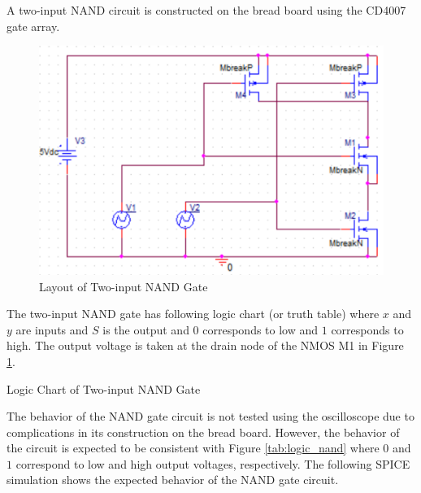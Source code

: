 
A two-input NAND circuit is constructed on the bread board using the CD4007 gate array.

\FloatBarrier

\begin{figure}[h!]
	\centering
	\includegraphics[scale=0.50]{./images/nand_schematic.PNG}
	\caption{Layout of Two-input NAND Gate}
	\label{fig:nand_schematic}
\end{figure}

\FloatBarrier

The two-input NAND gate has following logic chart (or truth table) where $x$ and $y$ are inputs and $S$ is the output and $0$ corresponds to low and $1$ corresponds to high.
The output voltage is taken at the drain node of the NMOS M1 in Figure \ref{fig:nand_schematic}.

\FloatBarrier

\begin{table}[h!]
	\centering
	\caption{Logic Chart of Two-input NAND Gate}
	\label{tab:logic_nand}
\end{table}

\FloatBarrier

The behavior of the NAND gate circuit is not tested using the oscilloscope due to complications in its construction on the bread board.
However, the behavior of the circuit is expected to be consistent with Figure \ref{tab:logic_nand} where $0$ and $1$ correspond to low and high output voltages, respectively.
The following SPICE simulation shows the expected behavior of the NAND gate circuit.

\FloatBarrier

